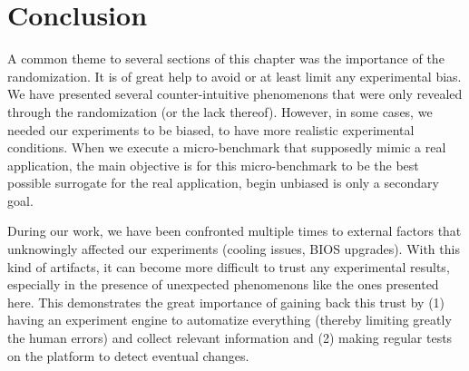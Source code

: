 	\section{Conclusion}
        A common theme to several sections of this chapter was the importance of the randomization. It is of great help
        to avoid or at least limit any experimental bias. We have presented several counter-intuitive phenomenons that
        were only revealed through the randomization (or the lack thereof). However, in some cases, we needed our
        experiments to be biased, to have more realistic experimental conditions. When we execute a micro-benchmark that
        supposedly mimic a real application, the main objective is for this micro-benchmark to be the best possible
        surrogate for the real application, begin unbiased is only a secondary goal.

        During our work, we have been confronted multiple times to external factors that unknowingly affected our
        experiments (\eg cooling issues, BIOS upgrades). With this kind of artifacts, it can become more difficult to
        trust any experimental results, especially in the presence of unexpected phenomenons like the ones presented
        here. This demonstrates the great importance of gaining back this trust by (1) having an experiment engine to
        automatize everything (thereby limiting greatly the human errors) and collect relevant information and (2)
        making regular tests on the platform to detect eventual changes.

